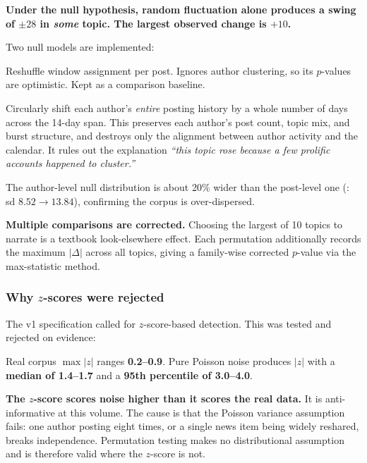 \documentclass[11pt]{article}
\begin{document}
\begin{keybox}
\textbf{Under the null hypothesis, random fluctuation alone produces a swing of
$\pm28$ in \emph{some} topic. The largest observed change is $+10$.}
\end{keybox}

Two null models are implemented:

\begin{description}[leftmargin=1.4em,style=nextline,itemsep=0.35em]
\item[post-level] Reshuffle window assignment per post. Ignores author
  clustering, so its $p$-values are optimistic. Kept as a comparison baseline.
\item[author-level (default)] Circularly shift each author's \emph{entire}
  posting history by a whole number of days across the 14-day span. This
  preserves each author's post count, topic mix, and burst structure, and
  destroys only the alignment between author activity and the calendar. It rules
  out the explanation \emph{``this topic rose because a few prolific accounts
  happened to cluster.''}
\end{description}

The author-level null distribution is about 20\% wider than the post-level one
(: sd $8.52 \to 13.84$), confirming the corpus is over-dispersed.

\textbf{Multiple comparisons are corrected.} Choosing the largest of 10 topics to
narrate is a textbook look-elsewhere effect. Each permutation additionally
records the maximum $|\Delta|$ across all topics, giving a family-wise corrected
$p$-value via the max-statistic method.

\subsubsection*{Why $z$-scores were rejected}

The v1 specification called for $z$-score-based detection. This was tested and
rejected on evidence:

\begin{warnbox}
Real corpus $\max|z|$ ranges \textbf{0.2--0.9}. Pure Poisson noise produces
$|z|$ with a \textbf{median of 1.4--1.7} and a \textbf{95th percentile of
3.0--4.0}.
\end{warnbox}

\textbf{The $z$-score scores noise higher than it scores the real data.} It is
anti-informative at this volume. The cause is that the Poisson variance
assumption fails: one author posting eight times, or a single news item being
widely reshared, breaks independence. Permutation testing makes no
distributional assumption and is therefore valid where the $z$-score is not.
\end{document}
